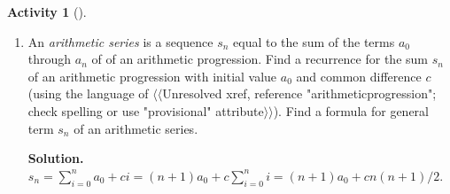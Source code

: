 \documentclass[10pt,]{book}
\theoremstyle{plain}
\theoremstyle{definition}
\newtheorem{activity}[project]{Activity}
\numberwithin{equation}{chapter}
\begin{document}
\begin{activity}[]
\begin{enumerate}[label=(\alph*)]
~\par
\item An \emph{arithmetic series} is a sequence \(s_n\) equal to the sum of the terms \(a_0\) through \(a_n\) of of an arithmetic progression. Find a recurrence for the sum \(s_n\) of an arithmetic progression with initial value \(a_0\) and common difference \(c\) (using the language of {$\langle\langle$Unresolved xref, reference "arithmeticprogression"; check spelling or use "provisional" attribute$\rangle\rangle$}). Find a formula for general term \(s_n\) of an arithmetic series.%
\par\medskip\noindent%
\textbf{Solution.}\quad \(s_n=\sum_{i=0}^n a_0 +ci =(n+1)a_0+c\sum_{i=0}^n i = (n+1)a_0
+cn(n+1)/2\).%

\end{enumerate}
\end{activity}
\typeout{************************************************}
\typeout{************************************************}
\end{document}
